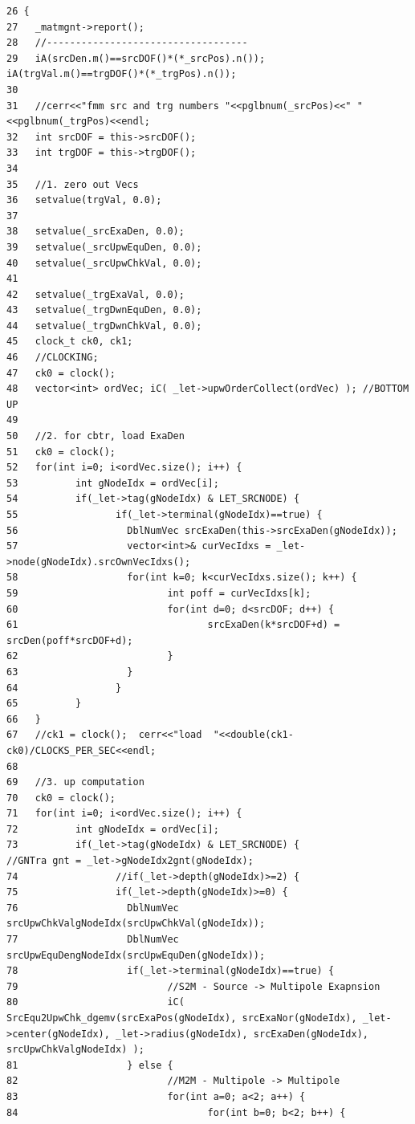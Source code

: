 \footnotesize\begin{verbatim}26 {
27   _matmgnt->report();
28   //-----------------------------------
29   iA(srcDen.m()==srcDOF()*(*_srcPos).n());  iA(trgVal.m()==trgDOF()*(*_trgPos).n());
30   
31   //cerr<<"fmm src and trg numbers "<<pglbnum(_srcPos)<<" "<<pglbnum(_trgPos)<<endl;
32   int srcDOF = this->srcDOF();
33   int trgDOF = this->trgDOF();
34   
35   //1. zero out Vecs
36   setvalue(trgVal, 0.0);
37   
38   setvalue(_srcExaDen, 0.0);
39   setvalue(_srcUpwEquDen, 0.0);
40   setvalue(_srcUpwChkVal, 0.0);
41   
42   setvalue(_trgExaVal, 0.0);
43   setvalue(_trgDwnEquDen, 0.0);
44   setvalue(_trgDwnChkVal, 0.0);
45   clock_t ck0, ck1;
46   //CLOCKING;
47   ck0 = clock();
48   vector<int> ordVec; iC( _let->upwOrderCollect(ordVec) ); //BOTTOM UP
49 
50   //2. for cbtr, load ExaDen
51   ck0 = clock();
52   for(int i=0; i<ordVec.size(); i++) {
53          int gNodeIdx = ordVec[i];
54          if(_let->tag(gNodeIdx) & LET_SRCNODE) {
55                 if(_let->terminal(gNodeIdx)==true) {
56                   DblNumVec srcExaDen(this->srcExaDen(gNodeIdx));
57                   vector<int>& curVecIdxs = _let->node(gNodeIdx).srcOwnVecIdxs();
58                   for(int k=0; k<curVecIdxs.size(); k++) {
59                          int poff = curVecIdxs[k];
60                          for(int d=0; d<srcDOF; d++) {
61                                 srcExaDen(k*srcDOF+d) = srcDen(poff*srcDOF+d);
62                          }
63                   }
64                 }
65          }
66   }
67   //ck1 = clock();  cerr<<"load  "<<double(ck1-ck0)/CLOCKS_PER_SEC<<endl;  
68   
69   //3. up computation
70   ck0 = clock();
71   for(int i=0; i<ordVec.size(); i++) {
72          int gNodeIdx = ordVec[i];
73          if(_let->tag(gNodeIdx) & LET_SRCNODE) {                //GNTra gnt = _let->gNodeIdx2gnt(gNodeIdx);
74                 //if(_let->depth(gNodeIdx)>=2) {
75                 if(_let->depth(gNodeIdx)>=0) {
76                   DblNumVec srcUpwChkValgNodeIdx(srcUpwChkVal(gNodeIdx));
77                   DblNumVec srcUpwEquDengNodeIdx(srcUpwEquDen(gNodeIdx));
78                   if(_let->terminal(gNodeIdx)==true) {
79                          //S2M - Source -> Multipole Exapnsion
80                          iC( SrcEqu2UpwChk_dgemv(srcExaPos(gNodeIdx), srcExaNor(gNodeIdx), _let->center(gNodeIdx), _let->radius(gNodeIdx), srcExaDen(gNodeIdx), srcUpwChkValgNodeIdx) );
81                   } else {
82                          //M2M - Multipole -> Multipole
83                          for(int a=0; a<2; a++) {
84                                 for(int b=0; b<2; b++) {

\end{verbatim}
